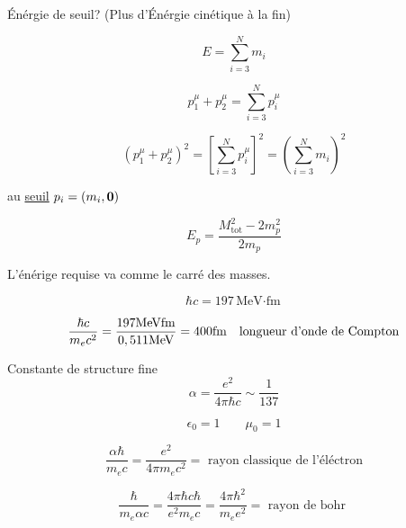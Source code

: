 Énérgie de seuil? (Plus d'Énérgie cinétique à la fin)


$$E = \sum_{i=3}^{N} m_i $$  

$$p_1^{\mu} + p_2^{\mu}= \sum_{i=3}^{N} p_i^{\mu}$$ 

$$\left( p_1^{\mu} + p_2^{\mu} \right)^2 = \left[ \sum_{i=3}^{N} p_i^{\mu} \right]^2 = \left( \sum_{i=3}^{N} m_i \right)^2  $$ 

au \underline{seuil} $p_i = (m_{i}, \vb{0})$  

$$E_p = \frac{M^2_{\text{tot}} - 2m_p^{2}}{2m_p} $$ 

L'énérige requise va comme le carré des masses.



\begin{tcolorbox}[title=Unités naturelles]
    $$\hbar c = 197 \text{MeV$\cdot$fm}$$ 
    
    $$\frac{\hbar c}{m_e c^2} = \frac{197 {\rm MeV fm}}{0,511 {\rm MeV}} = 400 {\rm fm} \quad \text{longueur d'onde de Compton} $$  

Constante de structure fine
$$\alpha = \frac{e^{2}}{4\pi\hbar{}c} \sim \frac{1}{137} $$ 
\begin{tcolorbox}[title=Heaviside-Lorentz]
    $$\epsilon_0 =1 \qquad \mu_0 = 1$$ 
     \end{tcolorbox}

$$\frac{\alpha\hbar}{m_e c} = \frac{e^{2}}{4\pi m_e c^2} = \text{ rayon classique de l'éléctron}   $$ 

$$\frac{\hbar}{m_{e{}}\alpha{}c} = \frac{4\pi\hbar c \hbar}{e^{2}m_e c} = \frac{4\pi\hbar^{2}}{m_e e^{2}} = \text{ rayon de bohr }     $$ 

\end{tcolorbox}

